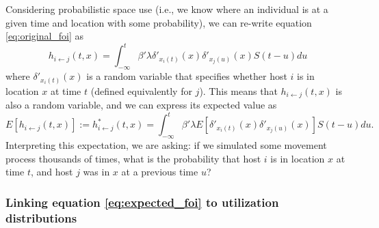 \documentclass[letterpaper]{article}
\begin{document}
Considering probabilistic space use (i.e., we know where an individual is at a given time and location with some probability), we can re-write equation \ref{eq:original_foi} as
\begin{equation}
    h_{i \leftarrow j}(t, x) = \int_{-\infty}^{t} \beta' \lambda \delta'_{x_i(t)}(x) \delta'_{x_j(u)}(x) S(t - u) du
    \label{eq:prob_foi}
\end{equation}
where $\delta'_{x_i(t)}(x)$ is a random variable that specifies whether host $i$ is in location $x$ at time $t$ (defined equivalently for $j$).  This means that $h_{i \leftarrow j}(t, x)$ is also a random variable, and we can express its expected value as 
\begin{equation}
    E[h_{i \leftarrow j}(t, x)] := h^*_{i \leftarrow j}(t, x) = \int_{-\infty}^{t} \beta' \lambda E[\delta'_{x_i(t)}(x) \delta'_{x_j(u)}(x)] S(t - u) du.
    \label{eq:expected_foi}
\end{equation}
Interpreting this expectation, we are asking: if we simulated some movement process thousands of times, what is the probability that host $i$ is in location $x$ at time $t$, and host $j$ was in $x$ at a previous time $u$? 

\subsubsection*{Linking equation \ref{eq:expected_foi} to utilization distributions}
\end{document}
